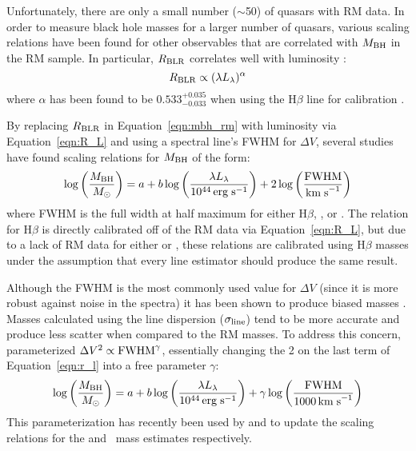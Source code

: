 Unfortunately, there are only a small number ($\sim$50) of quasars with RM data.  In order to measure black hole masses for a larger number of quasars, various scaling relations have been found for other observables that are correlated with $M_{\rm BH}$ in the RM sample.  In particular, $R_{\rm BLR}$ correlates well with luminosity \citep[e.g.][]{Kaspi:2000,Kaspi:2005,Bentz:2006,Bentz:2009,Bentz:2013}:
\begin{equation} \label{eqn:R_L}
 R_{\rm BLR} \propto (\lambda L_{\lambda})^\alpha
\end{equation}
where $\alpha$ has been found to be $0.533^{+0.035}_{-0.033}$ when using the H$\beta$ line for calibration \citep{Bentz:2013}.

By replacing $R_{\rm BLR}$ in Equation~\ref{eqn:mbh_rm} with luminosity via Equation~\ref{eqn:R_L} and using a spectral line's FWHM for $\Delta V$, several studies \citep[e.g.][]{McLure:2004,Vestergaard:2006,Vestergaard:2009} have found scaling relations for $M_{\rm BH}$ of the form:
\begin{equation} \label{eqn:r_l}
 \log{\left(\frac{\mbh}{M_\sun}\right)} = a + b\log{\left( \frac{\lambda L_{\lambda}}{10^{44}\,{\rm erg\; s}^{-1}} \right)} + 2\log{\left( \frac{\rm FWHM}{{\rm km\; s}^{-1}} \right)}
\end{equation}
where FWHM is the full width at half maximum for either H$\beta$, , or \civ.  The relation for H$\beta$ is directly calibrated off of the RM data via Equation~\ref{eqn:R_L}, but due to a lack of RM data for either  or \civ, these relations are calibrated using H$\beta$ masses under the assumption that every line estimator should produce the same result.

Although the FWHM is the most commonly used value for $\Delta V$ (since it is more robust against noise in the spectra) it has been shown to produce biased masses \citep{Wang:2009,Rafiee:2011,Peterson:2011,Denney:2012,Denney:2013,Park:2013}.  Masses calculated using the line dispersion ($\sigma_{\rm line}$) tend to be more accurate and produce less scatter when compared to the RM masses.  To address this concern, \citet{Wang:2009} parameterized $\Delta V^2 \propto {\rm FWHM}^\gamma$, essentially changing the 2 on the last term of Equation~\ref{eqn:r_l} into a free parameter $\gamma$:
\begin{equation} \label{eqn:r_l_gamma}
 \log{\left(\frac{\mbh}{M_\sun}\right)} = a + b\log{\left( \frac{\lambda L_{\lambda}}{10^{44}\,{\rm erg\; s}^{-1}} \right)} + \gamma \log{\left( \frac{\rm FWHM}{1000\, {\rm km\; s}^{-1}} \right)}
\end{equation}
 This parameterization has recently been used by \citet{Rafiee:2011} and \citet{Park:2013} to update the scaling relations for the  and \civ\ mass estimates respectively. 

